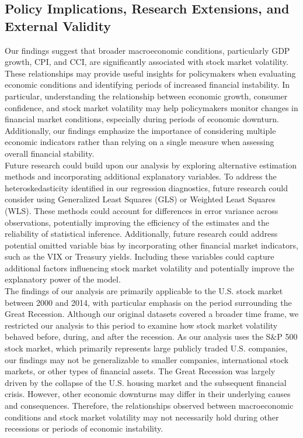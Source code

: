 \subsection{Policy Implications, Research Extensions, and External Validity}
Our findings suggest that broader macroeconomic conditions, particularly GDP growth, CPI, and CCI, are significantly associated with stock market volatility. These relationships may provide useful insights for policymakers when evaluating economic conditions and identifying periods of increased financial instability. In particular, understanding the relationship between economic growth, consumer confidence, and stock market volatility may help policymakers monitor changes in financial market conditions, especially during periods of economic downturn. Additionally, our findings emphasize the importance of considering multiple economic indicators rather than relying on a single measure when assessing overall financial stability. \\
\indent Future research could build upon our analysis by exploring alternative estimation methods and incorporating additional explanatory variables. To address the heteroskedasticity identified in our regression diagnostics, future research could consider using Generalized Least Squares (GLS) or Weighted Least Squares (WLS). These methods could account for differences in error variance across observations, potentially improving the efficiency of the estimates and the reliability of statistical inference. Additionally, future research could address potential omitted variable bias by incorporating other financial market indicators, such as the VIX or Treasury yields. Including these variables could capture additional factors influencing stock market volatility and potentially improve the explanatory power of the model. \\
\indent The findings of our analysis are primarily applicable to the U.S. stock market between 2000 and 2014, with particular emphasis on the period surrounding the Great Recession. Although our original datasets covered a broader time frame, we restricted our analysis to this period to examine how stock market volatility behaved before, during, and after the recession. As our analysis uses the S\&P 500 stock market, which primarily represents large publicly traded U.S. companies, our findings may not be generalizable to smaller companies, international stock markets, or other types of financial assets. The Great Recession was largely driven by the collapse of the U.S. housing market and the subsequent financial crisis. However, other economic downturns may differ in their underlying causes and consequences. Therefore, the relationships observed between macroeconomic conditions and stock market volatility may not necessarily hold during other recessions or periods of economic instability.


\clearpage
\nocite{*}




